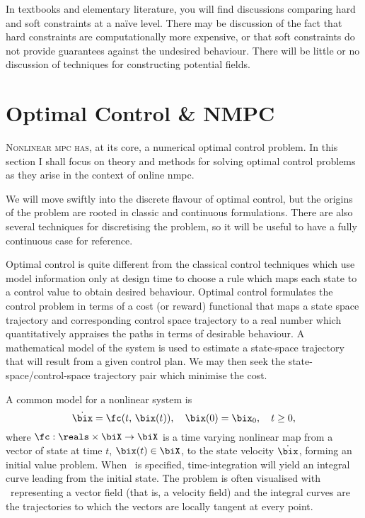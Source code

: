 In textbooks and elementary literature, you will find discussions comparing hard
and soft constraints at a naïve level. There may be discussion of the fact that
hard constraints are computationally more expensive, or that soft constraints do
not provide guarantees against the undesired behaviour. There will be little or
no discussion of techniques for constructing potential fields.



\section{Optimal Control \& NMPC}%
\label{sec:NMPC}


\textsc{Nonlinear \acs{mpc} has}, at its core, a numerical optimal control
problem. In this section I shall focus on theory and methods for solving optimal
control problems as they arise in the context of online \ac{nmpc}.

We will move swiftly into the discrete flavour of optimal control, but the
origins of the problem are rooted in classic and continuous formulations. There
are also several techniques for discretising the problem, so it will be useful
to have a fully continuous case for reference.

Optimal control is quite different from the classical control techniques which
use model information only at design time to choose a rule which maps each state
to a control value to obtain desired behaviour. Optimal control formulates the
control problem in terms of a cost (or reward) functional that maps a state
space trajectory and corresponding control space trajectory to a real number
which quantitatively appraises the paths in terms of desirable behaviour. A
mathematical model of the system is used to estimate a state-space trajectory
that will result from a given control plan. We may then seek the
state-space/control-space trajectory pair which minimise the cost.

A common model for a nonlinear system is
%
\begin{equation}\label{eq:generalNonlinearSystemWithoutInput}
  \dot{\bix} = \fc(t,\, \bix(t)),\quad \bix(0) = \bix_0, \quad t\ge0,
\end{equation}
%
where $\fc : \reals\times\biX\rightarrow \biX$ is a time varying nonlinear map
from a vector of state at time $t$, $\bix(t)\in\biX$, to the state velocity
$\dot\bix$, forming an initial value problem. When \fc\ is specified,
time-integration will yield an integral curve leading from the initial state.
The problem is often visualised with \fc\ representing a vector field (that is,
a velocity field) and the integral curves are the trajectories to which the
vectors are locally tangent at every point.


